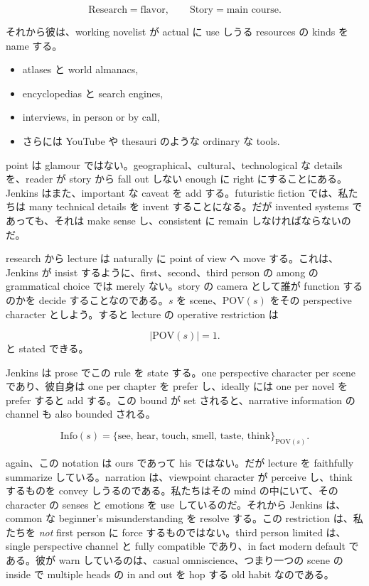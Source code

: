 \begin{equation}
\text{Research}=\text{flavor},\qquad \text{Story}=\text{main course}.
\end{equation}

それから彼は、working novelist が actual に use しうる resources の kinds を name する。

\begin{itemize}
\item atlases と world almanacs,
\item encyclopedias と search engines,
\item interviews, in person or by call,
\item さらには YouTube や thesauri のような ordinary な tools.
\end{itemize}

point は glamour ではない。geographical、cultural、technological な details を、reader が story から fall out しない enough に right にすることにある。Jenkins はまた、important な caveat を add する。futuristic fiction では、私たちは many technical details を invent することになる。だが invented systems であっても、それは make sense し、consistent に remain しなければならないのだ。

research から lecture は naturally に point of view へ move する。これは、Jenkins が insist するように、first、second、third person の among の grammatical choice では merely ない。story の camera として誰が function するのかを decide することなのである。\(s\) を scene、\(\mathrm{POV}(s)\) をその perspective character としよう。すると lecture の operative restriction は

\begin{equation}
|\mathrm{POV}(s)|=1.
\end{equation}
と stated できる。

Jenkins は prose でこの rule を state する。one perspective character per scene であり、彼自身は one per chapter を prefer し、ideally には one per novel を prefer すると add する。この bound が set されると、narrative information の channel も also bounded される。

\begin{equation}
\mathrm{Info}(s)=\{\text{see, hear, touch, smell, taste, think}\}_{\mathrm{POV}(s)}.
\end{equation}

again、この notation は ours であって his ではない。だが lecture を faithfully summarize している。narration は、viewpoint character が perceive し、think するものを convey しうるのである。私たちはその mind の中にいて、その character の senses と emotions を use しているのだ。それから Jenkins は、common な beginner's misunderstanding を resolve する。この restriction は、私たちを \emph{not} first person に force するものではない。third person limited は、single perspective channel と fully compatible であり、in fact modern default である。彼が warn しているのは、casual omniscience、つまり一つの scene の inside で multiple heads の in and out を hop する old habit なのである。


